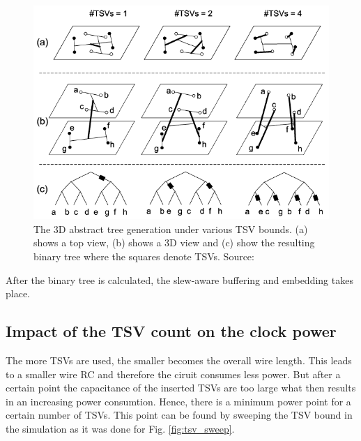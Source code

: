 \documentclass[conference]{IEEEtran}
\begin{document}
\begin{figure}[htbp]
	\includegraphics[width=1\linewidth]{img/tree_examples.png}
	\centering
	\caption{The 3D abstract tree generation under various TSV bounds. (a) shows a top view, (b) shows a 3D view and (c) show the resulting binary tree where the squares denote TSVs. Source: \cite{b2}}
	\label{fig:tree_examples}
\end{figure}

After the binary tree is calculated, the slew-aware buffering and embedding takes place.

\subsection{Impact of the TSV count on the clock power}
The more TSVs are used, the smaller becomes the overall wire length. This leads to a smaller wire RC and therefore the ciruit consumes less power. But after a certain point the capacitance of the inserted TSVs are too large what then results in an increasing power consumtion. Hence, there is a minimum power point for a certain number of TSVs. This point can be found by sweeping the TSV bound in the simulation as it was done for Fig. \ref{fig:tsv_sweep}.
\end{document}
